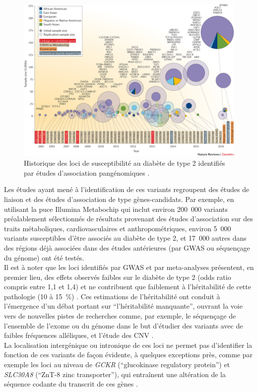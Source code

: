 \documentclass[11pt,a4paper,notrimn]{krantz}
\theoremstyle{definition}
\theoremstyle{definition}
\theoremstyle{remark}
\begin{document}
\begin{figure}[!htb]

{\centering \includegraphics[width=6in]{FiguresTables/T2Dhistory} 

}

\caption{Historique des loci de susceptibilité au diabète de
type 2 identifiés par études d'association pangénomiques
\citep{flannick_type_2016}.}\label{fig:T2Dhistory}
\end{figure}

Les études ayant mené à l'identification de ces variants regroupent des
études de liaison et des études d'association de type gènes-candidats.
Par exemple, en utilisant la puce Illumina Metabochip
\citep{voight_metabochip_2012} qui inclut environ 200~000 variants
préalablement sélectionnés de résultats provenant des études
d'association sur des traits métaboliques, cardiovasculaires et
anthropométriques, environ 5~000 variants susceptibles d'être associés
au diabète de type 2, et 17~000 autres dans des régions déjà associées
dans des études antérieures (par GWAS ou séquençage du génome) ont été
testés.\\
Il est à noter que les loci identifiés par GWAS et par meta-analyses
présentent, en premier lieu, des effets observés faibles sur le diabète
de type 2 (odds ratio compris entre 1,1 et 1,4) et ne contribuent que
faiblement à l'héritabilité de cette pathologie (10 à 15~\%)
\citep{scott_genome-wide_2007, morris_large-scale_2012}. Ces estimations
de l'héritabilité ont conduit à l'émergence d'un débat portant sur
``l'héritabilité manquante'', ouvrant la voie vers de nouvelles pistes
de recherches comme, par exemple, le séquençage de l'ensemble de l'exome
ou du génome dans le but d'étudier des variants avec de faibles
fréquences alléliques, et l'étude des CNV
\citep{manolio_finding_2009}.\\
La localisation intergénique ou intronique de ces loci ne permet pas
d'identifier la fonction de ces variants de façon évidente, à quelques
exceptions près, comme par exemple les loci au niveau de \emph{GCKR}
(``glucokinase regulatory protein'') et \emph{SLC30A8} (``ZnT-8 zinc
transporter''), qui entraînent une altération de la séquence codante du
transcrit de ces gènes
\citep{beer_p446l_2009, mccarthy_genome-wide_2009, saxena_genome-wide_2007, sladek_genome-wide_2007}.
\end{document}
